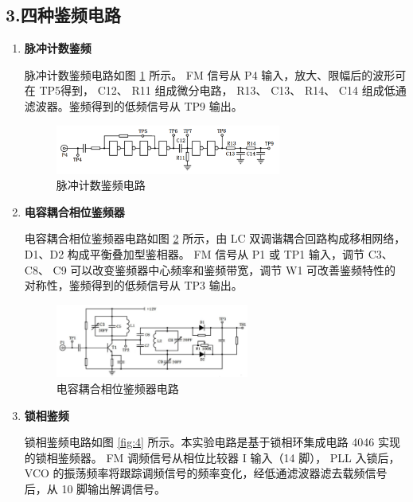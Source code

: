 \documentclass[UTF8]{ctexart}
\begin{document}
\subsection*{3.四种鉴频电路}
\begin{enumerate}[(1)]
    \item \textbf{脉冲计数鉴频}
    
    脉冲计数鉴频电路如图 \ref{fig:2} 所示。 FM 信号从 P4 输入，放大、限幅后的波形可在 TP5得到， C12、 R11 组成微分电路， R13、 C13、 R14、 C14 组成低通滤波器。鉴频得到的低频信号从 TP9 输出。
    
    \begin{figure}[H]
        \centering
        \includegraphics[width=0.7\textwidth]{pics/2.png}

        \caption{脉冲计数鉴频电路}\label{fig:2}
    \end{figure}
    \vspace{-2em}
    \item \textbf{电容耦合相位鉴频器}

    电容耦合相位鉴频器电路如图 \ref{fig:3} 所示，由 LC 双调谐耦合回路构成移相网络， D1、D2 构成平衡叠加型鉴相器。 FM 信号从 P1 或 TP1 输入，调节 C3、 C8、 C9 可以改变鉴频器中心频率和鉴频带宽，调节 W1 可改善鉴频特性的对称性，鉴频得到的低频信号从 TP3 输出。

    \begin{figure}[H]
        \centering
        \includegraphics[width=0.6\textwidth]{pics/3.png}

        \caption{电容耦合相位鉴频器电路}\label{fig:3}
    \end{figure}
    \vspace{-2em}
    \item \textbf{锁相鉴频}

    锁相鉴频电路如图 \ref{fig:4} 所示。本实验电路是基于锁相环集成电路 4046 实现的锁相鉴频器。 FM 调频信号从相位比较器 I 输入（14 脚）， PLL 入锁后， VCO 的振荡频率将跟踪调频信号的频率变化，经低通滤波器滤去载频信号后，从 10 脚输出解调信号。


\end{enumerate}
\end{document}
